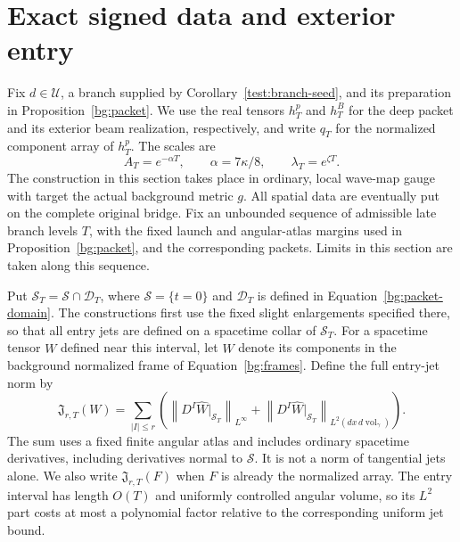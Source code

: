 \section{Exact signed data and exterior entry}\label{prep:section}

Fix $d\in\mathcal U$, a branch supplied by
Corollary~\ref{test:branch-seed}, and its preparation in
Proposition~\ref{bg:packet}.  We use the real tensors $h_T^p$ and
$h_T^B$ for the deep packet and its exterior beam realization,
respectively, and write $q_T$ for the normalized component array of
$h_T^p$.  The scales are
\[
 A_T=e^{-\alpha T},\qquad \alpha=7\kappa/8,\qquad
 \lambda_T=e^{\zeta T}.
\]
The construction in this section takes place in ordinary, local
wave-map gauge with target the actual background metric $g$.
All spatial data are eventually put on the complete original bridge.
Fix an unbounded sequence of admissible late branch levels $T$,
with the fixed launch and angular-atlas margins used in
Proposition~\ref{bg:packet}, and the corresponding packets.
Limits in this section are taken along this sequence.

Put $\mathcal S_T=\mathcal S\cap\mathcal D_T$, where
$\mathcal S=\{t=0\}$ and $\mathcal D_T$ is defined in
Equation~\eqref{bg:packet-domain}. The constructions first use the
fixed slight enlargements specified there, so that all entry jets
are defined on a spacetime collar of $\mathcal S_T$.
For a spacetime tensor $W$ defined near this interval, let $\widehat W$ denote
its components in the background normalized frame of
Equation~\eqref{bg:frames}.  Define the full entry-jet norm by
\begin{equation}\label{prep:entry-norm}
 \mathfrak J_{r,T}(W)=
 \sum_{|I|\le r}\left(
   \left\|D^I\widehat W\big|_{\mathcal S_T}\right\|_{L^\infty}
  +\left\|D^I\widehat W\big|_{\mathcal S_T}\right\|_{L^2(dx\,d\operatorname{vol}_\gamma)}
                         \right).
\end{equation}
The sum uses a fixed finite angular atlas and includes ordinary
spacetime derivatives, including derivatives normal to $\mathcal S$.
It is not a norm of tangential jets alone.  We also write
$\mathfrak J_{r,T}(F)$ when $F$ is already the normalized array.
The entry interval has length $O(T)$ and uniformly controlled angular
volume, so its $L^2$ part costs at most a polynomial factor relative
to the corresponding uniform jet bound.

